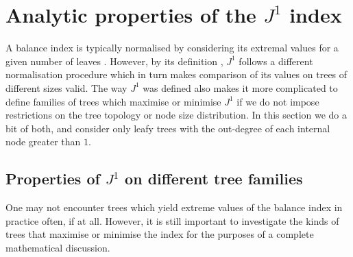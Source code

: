\section{Analytic properties of the $J^1$ index}
A balance index is typically normalised by considering its extremal values for a given number of leaves \cite{fischer_tree_2021}. However, by its definition \cite{lemant_robust_2021}, $J^1$ follows a different normalisation procedure which in turn makes comparison of its values on trees of different sizes valid. The way $J^1$ was defined also makes it more complicated to define families of trees which maximise or minimise $J^1$ if we do not impose restrictions on the tree topology or node size distribution. In this section we do a bit of both, and consider only leafy trees with the out-degree of each internal node greater than $1$.


	
\subsection{Properties of $J^1$ on different tree families}
One may not encounter trees which yield extreme values of the balance index in practice often, if at all. However, it is still important to investigate the kinds of trees that maximise or minimise the index for the purposes of a complete mathematical discussion. 
	
